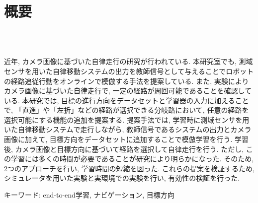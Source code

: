 \chapter*{概要}
\thispagestyle{empty}
%
\begin{center}
  \scalebox{1.5}{視覚と行動のend-to-end学習により}\\
  \scalebox{1.5}{経路追従行動をオンラインで模倣する手法の提案}\\
  \scalebox{1.5}{（目標方向による経路選択機能の追加と検証）}
\end{center}
\vspace{1.0zh}
%
\par
近年, カメラ画像に基づいた自律走行の研究が行われている. 本研究室でも, 測域センサを用いた自律移動システムの出力を教師信号として与えることでロボットの経路追従行動をオンラインで模倣する手法を提案している. また, 実験によりカメラ画像に基づいた自律走行で, 一定の経路が周回可能であることを確認している. 本研究では, 目標の進行方向をデータセットと学習器の入力に加えることで, 「直進」や「左折」などの経路が選択できる分岐路において, 任意の経路を選択可能にする機能の追加を提案する. 
提案手法では, 学習時に測域センサを用いた自律移動システムで走行しながら, 教師信号であるシステムの出力とカメラ画像に加えて, 目標方向をデータセットに追加することで模倣学習を行う.
学習後, カメラ画像と目標方向に基づいて経路を選択して自律走行を行う. 
ただし, この学習には多くの時間が必要であることが研究により明らかになった. そのため, 2つのアプローチを行い, 学習時間の短縮を図った. 
これらの提案を検証するため, シミュレータを用いた実験と実環境での実験を行い, 有効性の検証を行った. 
\vspace{12pt}
\par キーワード: end-to-end学習, ナビゲーション, 目標方向
%
\newpage
